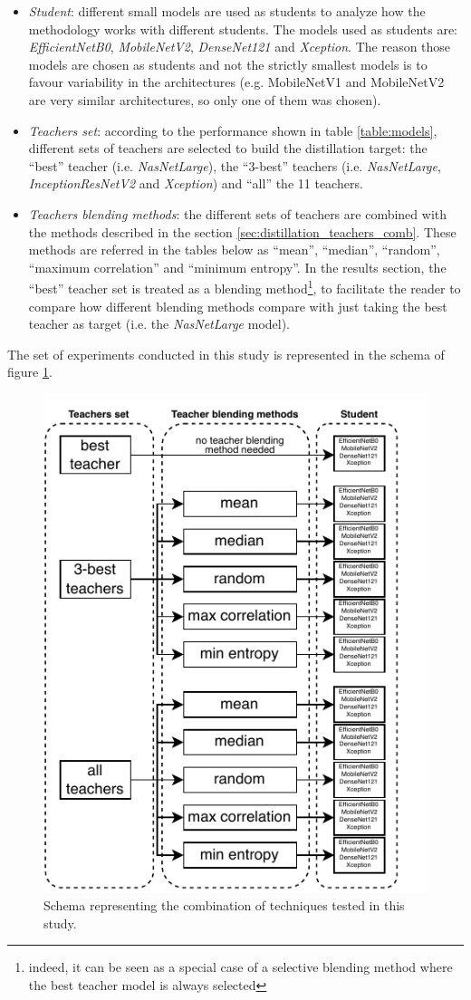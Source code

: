  \begin{itemize}
	 \item \textit{Student}: different small models are used as students to analyze how the methodology works with different students. The models used as students are: \textit{EfficientNetB0}, \textit{MobileNetV2}, \textit{DenseNet121} and \textit{Xception}. The reason those models are chosen as students and not the strictly smallest models is to favour variability in the architectures (e.g. MobileNetV1 and MobileNetV2 are very similar architectures, so only one of them was chosen).
	 \item \textit{Teachers set}: according to the performance shown in table \ref{table:models}, different sets of teachers are selected to build the distillation target: the ``best'' teacher (i.e. \textit{NasNetLarge}), the ``3-best'' teachers (i.e. \textit{NasNetLarge}, \textit{InceptionResNetV2} and \textit{Xception}) and ``all'' the 11 teachers.
	 \item \textit{Teachers blending methods}: the different sets of teachers are combined with the methods described in the section \ref{sec:distillation_teachers_comb}. These methods are referred in the tables below as ``mean'', ``median'', ``random'', ``maximum correlation'' and ``minimum entropy''. In the results section, the ``best'' teacher set is treated as a blending method\footnote{indeed, it can be seen as a special case of a selective blending method where the best teacher model is always selected}, to facilitate the reader to compare how different blending methods compare with just taking the best teacher as target (i.e. the \textit{NasNetLarge} model). 
 \end{itemize}

 The set of experiments conducted in this study is represented in the schema of figure \ref{fig:schema}.

\begin{figure}[h!]
 \centering
 \includegraphics[width=0.6\linewidth]{distillation/images/schema}
 \caption[Distillation expriments summary schema]{Schema representing the combination of techniques tested in this study.}
 \label{fig:schema}
\end{figure}


